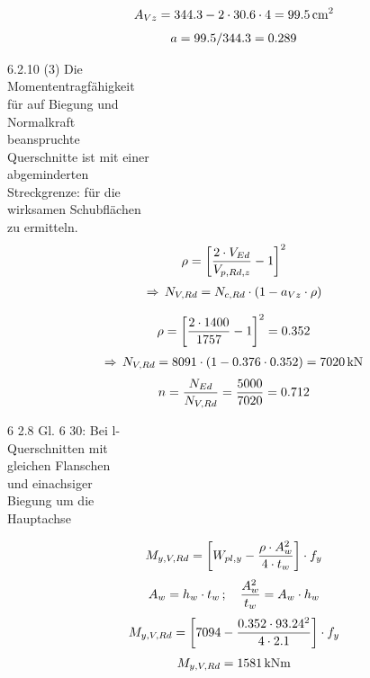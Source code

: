 \documentclass[graybox,envcountchap,sectrefs]{svmono}
\begin{document}
 \begin{align}
  A_{Vz} = 344.3 - 2 \cdot 30.6 \cdot 4 = 99.5\,\text{cm}^2 \nonumber
 \end{align}
 \begin{align}
 a = 99.5/344.3 = 0.289\nonumber
 \end{align}

 6.2.10 (3) Die \\
 Momententragf\"{a}higkeit\\
  f\"{u}r auf Biegung und\\
 Normalkraft\\
  beanspruchte\\
   Querschnitte ist mit einer\\
    abgeminderten\\
Streckgrenze: f\"{u}r die\\
 wirksamen Schubfl\"{a}chen\\
  zu ermitteln.\\

\begin{align}
\rho = \bigg[ \frac{2 \cdot V_{Ed}}{V_{p,Rd,z}} - 1 \bigg]^2\nonumber
\end{align}
\begin{align}
\Rightarrow \,N_{V,Rd} = N_{c,Rd} \cdot (1 - a_{Vz} \cdot \rho)\nonumber
\end{align}

\begin{align}
\rho = \bigg[\frac{ 2 \cdot 1400}{1757} - 1 \bigg]^2 = 0.352 \nonumber
\end{align}
\begin{align}
\Rightarrow \,N_{V,Rd} = 8091 \cdot (1 - 0.376 \cdot 0.352) = 7020\,\text{kN}\nonumber
\end{align}
\begin{align}
n = \frac{N_{Ed}}{N_{V,Rd}} = \frac{5000}{7020} = 0.712 \nonumber
\end{align}


6 2.8 	Gl. 6 30: Bei l-\\
Querschnitten mit\\
 gleichen Flanschen\\
  und einachsiger\\
   Biegung um die\\
    Hauptachse

\begin{align}
M_{y,V,Rd} = \bigg[ W_{pl,y} - \frac{\rho \cdot A_w^2}{4 \cdot t_w} \bigg] \cdot f_y \nonumber
\end{align}
\begin{align}
A_w = h_w \cdot t_w\,;\quad  \frac{A_w^2}{t_w} = A_w \cdot h_w \nonumber
\end{align}
\begin{align}
M_{y,V,Rd} = \bigg[ 7094 - \frac{0.352 \cdot 93.24^2}{4 \cdot 2.1} \bigg] \cdot f_y \nonumber
\end{align}
\begin{align}
M_{y,V,Rd} = 1581\,\text{kNm}\nonumber
\end{align}
\end{document}
